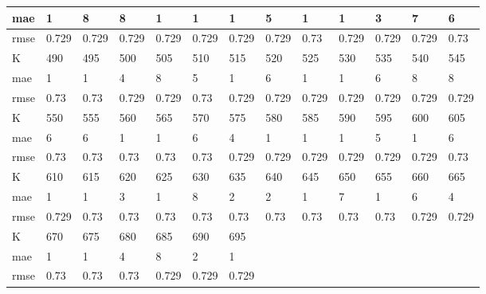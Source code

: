 \begin{appendices}
\begin{center}
\begin{tabularx}{\textwidth}{|l|X|X|X|X|X|X|X|X|X|X|X|X|}
		mae & 1 & 8 & 8 & 1 & 1 & 1 & 5 & 1 & 1 & 3 & 7 & 6 \\ \hline 
		rmse & 0.729 & 0.729 & 0.729 & 0.729 & 0.729 & 0.729 & 0.729 & 0.73 & 0.729 & 0.729 & 0.729 & 0.73 \\ \hline 
		\hline 
		K & 490 & 495 & 500 & 505 & 510 & 515 & 520 & 525 & 530 & 535 & 540 & 545 \\ \hline 
		mae & 1 & 1 & 4 & 8 & 5 & 1 & 6 & 1 & 1 & 6 & 8 & 8 \\ \hline 
		rmse & 0.73 & 0.73 & 0.729 & 0.729 & 0.73 & 0.729 & 0.729 & 0.729 & 0.729 & 0.729 & 0.729 & 0.729 \\ \hline 
		\hline 
		K & 550 & 555 & 560 & 565 & 570 & 575 & 580 & 585 & 590 & 595 & 600 & 605 \\ \hline 
		mae & 6 & 6 & 1 & 1 & 6 & 4 & 1 & 1 & 1 & 5 & 1 & 6 \\ \hline 
		rmse & 0.73 & 0.73 & 0.73 & 0.73 & 0.73 & 0.729 & 0.729 & 0.729 & 0.729 & 0.729 & 0.729 & 0.73 \\ \hline 
		\hline 
		K & 610 & 615 & 620 & 625 & 630 & 635 & 640 & 645 & 650 & 655 & 660 & 665 \\ \hline 
		mae & 1 & 1 & 3 & 1 & 8 & 2 & 2 & 1 & 7 & 1 & 6 & 4 \\ \hline 
		rmse & 0.729 & 0.73 & 0.73 & 0.73 & 0.73 & 0.73 & 0.73 & 0.73 & 0.73 & 0.73 & 0.729 & 0.729 \\ \hline 
		\hline 
		K & 670 & 675 & 680 & 685 & 690 & 695  & & & & & & \\ \hline 
		mae & 1 & 1 & 4 & 8 & 2 & 1 & & & & & &  \\ \hline 
		rmse & 0.73 & 0.73 & 0.73 & 0.729 & 0.729 & 0.729  & & & & & & \\ \hline 
	\end{tabularx} 
\end{center}


\end{appendices}
